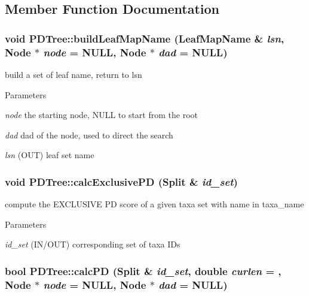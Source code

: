 \subsection{Member Function Documentation}
\hypertarget{classPDTree_ad309e7ef92c45dcad2e84bad0f216cb1}{
\subsubsection[{buildLeafMapName}]{\setlength{\rightskip}{0pt plus 5cm}void PDTree::buildLeafMapName (LeafMapName \& {\em lsn}, \/  {\bf Node} $\ast$ {\em node} = {\ttfamily NULL}, \/  {\bf Node} $\ast$ {\em dad} = {\ttfamily NULL})}}
\label{classPDTree_ad309e7ef92c45dcad2e84bad0f216cb1}
build a set of leaf name, return to lsn 
\begin{DoxyParams}{Parameters}
\item[{\em node}]the starting node, NULL to start from the root \item[{\em dad}]dad of the node, used to direct the search \item[{\em lsn}](OUT) leaf set name \end{DoxyParams}
\hypertarget{classPDTree_afe962ef278b4c52c969d073c8909a3e5}{
\subsubsection[{calcExclusivePD}]{\setlength{\rightskip}{0pt plus 5cm}void PDTree::calcExclusivePD ({\bf Split} \& {\em id\_\-set})}}
\label{classPDTree_afe962ef278b4c52c969d073c8909a3e5}
compute the EXCLUSIVE PD score of a given taxa set with name in taxa\_\-name 
\begin{DoxyParams}{Parameters}
\item[{\em id\_\-set}](IN/OUT) corresponding set of taxa IDs \end{DoxyParams}
\hypertarget{classPDTree_a0f7b9ac448266270a1e9d3d18218dc2e}{
\subsubsection[{calcPD}]{\setlength{\rightskip}{0pt plus 5cm}bool PDTree::calcPD ({\bf Split} \& {\em id\_\-set}, \/  double {\em curlen} = {}, \/  {\bf Node} $\ast$ {\em node} = {\ttfamily NULL}, \/  {\bf Node} $\ast$ {\em dad} = {\ttfamily NULL})}}
